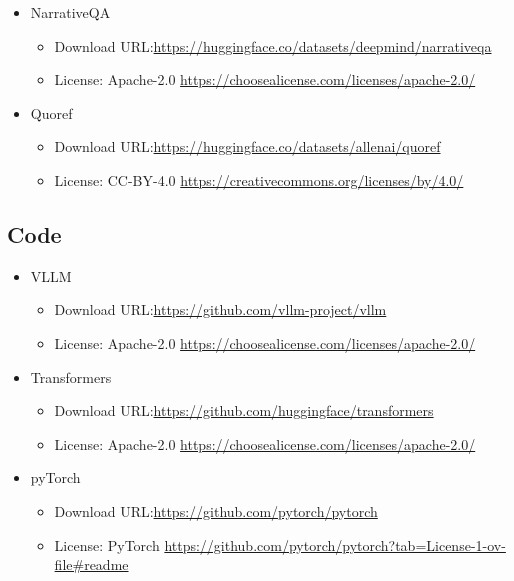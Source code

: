 \documentclass[11pt]{article}
\begin{document}
\begin{itemize}
		\item NarrativeQA
		\begin{itemize}
			\item Download URL:\newline \url{https://huggingface.co/datasets/deepmind/narrativeqa}
			\item License: Apache-2.0  \newline \url{https://choosealicense.com/licenses/apache-2.0/}
		\end{itemize}
		
		\item Quoref
		\begin{itemize}
			\item Download URL:\newline \url{https://huggingface.co/datasets/allenai/quoref}
			\item License: CC-BY-4.0 \newline \url{https://creativecommons.org/licenses/by/4.0/}
		\end{itemize}
	\end{itemize}
	
	\subsection{Code}
	
	\begin{itemize}
		
		\item VLLM
		\begin{itemize}
			\item Download URL:\newline \url{https://github.com/vllm-project/vllm}
			\item License: Apache-2.0  \newline \url{https://choosealicense.com/licenses/apache-2.0/}
		\end{itemize}
		
		\item Transformers
		\begin{itemize}
			\item Download URL:\newline \url{https://github.com/huggingface/transformers}
			\item License: Apache-2.0  \newline \url{https://choosealicense.com/licenses/apache-2.0/}
		\end{itemize}
		
		\item pyTorch
		\begin{itemize}
			\item Download URL:\newline \url{https://github.com/pytorch/pytorch}
			\item License: PyTorch  \newline \url{https://github.com/pytorch/pytorch?tab=License-1-ov-file#readme}
		\end{itemize}
	\end{itemize}
	
	
\end{document}
